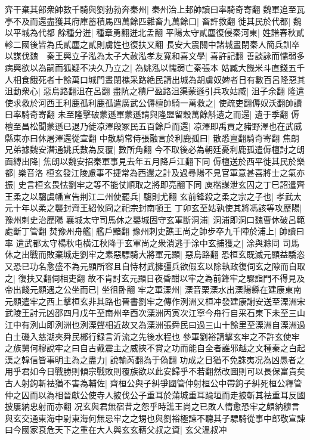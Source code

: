 弈干棄其部衆帥數千騎與劉勃勃奔秦州|{
	秦州治上邽帥讀曰率騎奇寄翻}
魏軍追至瓦亭不及而還盡獲其府庫蓄積馬四萬餘匹雜畜九萬餘口|{
	畜許救翻}
徙其民於代都|{
	魏以平城為代都}
餘種分迸|{
	種章勇翻迸北孟翻}
平陽太守貳塵復侵秦河東|{
	姓譜春秋貳軫二國後皆為氏貳塵之貳則虜姓也復扶又翻}
長安大震關中諸城晝閉秦人簡兵訓卒以謀伐魏　秦王興立子泓為太子大赦泓孝友寛和喜文學|{
	喜許記翻}
善談詠而懦弱多病興欲以為嗣而狐疑不决久乃立之|{
	為姚泓以懦弱亡秦張本}
姑臧大饑米斗直錢五千人相食餓死者十餘萬口城門晝閉樵采路絶民請出城為胡虜奴婢者日有數百呂隆惡其沮動衆心|{
	惡烏路翻沮在呂翻}
盡阬之積尸盈路沮渠蒙遜引兵攻姑臧|{
	沮子余翻}
隆遣使求救於河西王利鹿孤利鹿孤遣廣武公傉檀帥騎一萬救之|{
	使疏吏翻傉奴沃翻帥讀曰率騎奇寄翻}
未至隆擊破蒙遜軍蒙遜請與隆盟留穀萬餘斛遺之而還|{
	遺于季翻}
傉檀至昌松聞蒙遜已退乃徙凉澤段冢民五百餘戶而還|{
	凉澤即禹貢之豬野澤也在武威縣東亦曰休屠澤還從宣翻}
中散騎常侍張融言於利鹿孤曰|{
	散悉亶翻騎奇寄翻}
焦朗兄弟據魏安潛通姚氏數為反覆|{
	數所角翻}
今不取後必為朝廷憂利鹿孤遣傉檀討之朗面縛出降|{
	焦朗以魏安招秦軍事見去年五月降戶江翻下同}
傉檀送於西平徙其民於樂都|{
	樂音洛}
桓玄發江陵慮事不捷常為西還之計及過尋陽不見官軍意甚喜將士之氣亦振|{
	史言桓玄畏怯劉牢之等不能仗順取之將即亮翻下同}
庾楷謀泄玄囚之丁巳詔遣齊王柔之以騶虞幡宣告荆江二州使罷兵|{
	騶則尤翻}
玄前鋒殺之柔之宗之子也|{
	孝武太元十年以柔之襲封齊王紹攸冏之祀宗封南頓王}
丁卯玄至姑孰使其將馮該等攻歷陽|{
	豫州刺史治歷陽}
襄城太守司馬休之嬰城固守玄軍斷洞浦|{
	洞浦即洞口魏曹休破呂範處斷丁管翻}
焚豫州舟艦|{
	艦戶黯翻}
豫州刺史譙王尚之帥步卒九千陣於浦上|{
	帥讀曰率}
遣武都太守楊秋屯横江秋降于玄軍尚之衆潰逃于涂中玄捕獲之|{
	涂與滁同}
司馬休之出戰而敗棄城走劉牢之素惡驃騎大將軍元顯|{
	惡烏路翻}
恐桓玄既滅元顯益驕恣又恐已功名愈盛不為元顯所容且自恃材武擁彊兵欲假玄以除執政復伺玄之隙而自取之|{
	復扶又翻伺相吏翻}
故不肯討玄元顯日夜昏酣以牢之為前鋒牢之驟詣門不得見及帝出餞元顯遇之公坐而已|{
	坐徂卧翻}
牢之軍溧州|{
	溧音栗溧水出溧陽縣在建康東南元顯遣牢之西上擊桓玄非其路也晉書劉牢之傳作洌洲又桓冲發建康謝安送至溧洲宋武陵王討元凶邵四月戊午至南州辛酉次溧洲丙寅次江寧今舟行自采石東下未至三山江中有洌山即洌洲也洌溧聲相近故又為溧洲張舜民曰過三山十餘里至溧洲自溧洲過白土磯入慈湖夾舜民郴行録言沂流之先後水程也}
參軍劉裕請擊玄牢之不許玄使牢之族舅何穆說牢之曰自古戴震主之威挾不賞之功而能自全者誰邪越之文種秦之白起漢之韓信皆事明主為之盡力|{
	說輸芮翻為于偽翻}
功成之日猶不免誅夷况為凶愚者之用乎君如今日戰勝則傾宗戰敗則覆族欲以此安歸乎不若翻然改圖則可以長保富貴矣古人射鉤斬袪猶不害為輔佐|{
	齊桓公與子糾爭國管仲射桓公中帶鉤子糾死桓公釋管仲之囚而以為相晉獻公使寺人披伐公子重耳於蒲城重耳踰垣而走披斬其袪重耳反國披屢納忠射而亦翻}
况玄與君無宿昔之怨乎時譙王尚之已敗人情愈恐牢之頗納穆言與玄交通東海中尉東海何無忌牢之之甥也與劉裕極諫不聽其子驃騎從事中郎敬宣諫曰今國家衰危天下之重在大人與玄玄藉父叔之資|{
	玄父溫叔冲}

